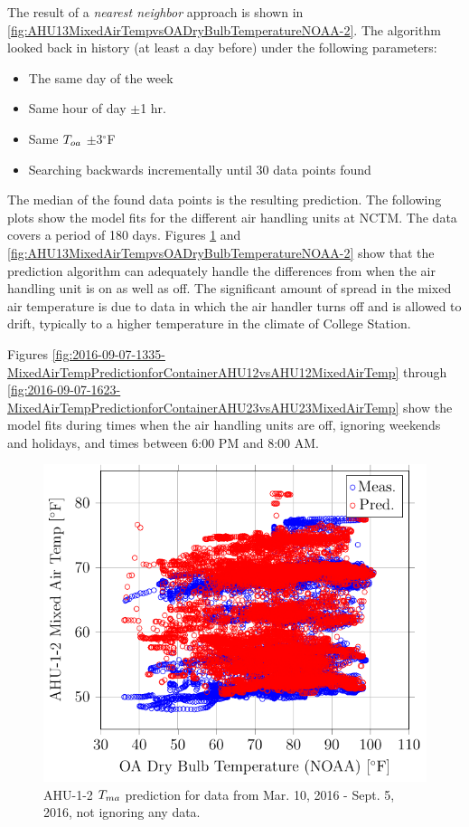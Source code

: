 The result of a \textit{nearest neighbor} approach is shown in \figref{} \ref{fig:AHU13MixedAirTempvsOADryBulbTemperatureNOAA-2}. The algorithm looked back in history (at least a day before) under the following parameters:

\begin{itemize}
    \item The same day of the week
    \item Same hour of day \(\pm\)1 hr.
    \item Same \(T_{oa}{}\) \(\pm\)3\(^\circ\)F
    \item Searching backwards incrementally until 30 data points found
\end{itemize}

The median of the found data points is the resulting prediction. The following
plots show the model fits for the different air handling units at NCTM. The
data covers a period of 180 days. Figures
\ref{fig:2016-09-07-1218-AHU12MixedAirTempvsOADryBulbTemperatureNOAA} and
\ref{fig:AHU13MixedAirTempvsOADryBulbTemperatureNOAA-2} show that the
prediction algorithm can adequately handle the differences from when the air
handling unit is on as well as off. The significant amount of spread in the
mixed air temperature is due to data in which the air handler turns off and is
allowed to drift, typically to a higher temperature in the climate of College
Station. 

Figures
\ref{fig:2016-09-07-1335-MixedAirTempPredictionforContainerAHU12vsAHU12MixedAirTemp}
through
\ref{fig:2016-09-07-1623-MixedAirTempPredictionforContainerAHU23vsAHU23MixedAirTemp}
show the model fits during times when the air handling units are off, ignoring
weekends and holidays, and times between 6:00 PM and 8:00 AM.

\newcommand{\matcaption}[1]{#1 \(\mat\) prediction for data from Mar. 10, 2016 - Sept. 5, 2016, not ignoring any data.}

\begin{figure}
\centering
\includegraphics[]{Plots/2016-09-07-1218-AHU12MixedAirTempvsOADryBulbTemperatureNOAA.pdf}
\caption{\matcaption{AHU-1-2}}
\label{fig:2016-09-07-1218-AHU12MixedAirTempvsOADryBulbTemperatureNOAA}
\end{figure}

